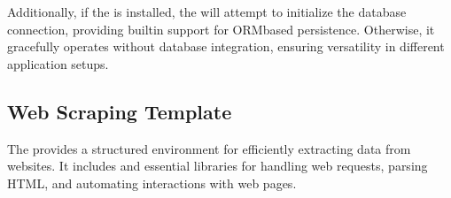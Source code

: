 \documentclass[letterpaper,10pt,english]{sphinxhowto}
\begin{document}
\sphinxAtStartPar
Additionally, if the  is installed, the  will attempt to initialize the database connection, providing built\sphinxhyphen{}in support for ORM\sphinxhyphen{}based persistence. Otherwise, it gracefully operates without database integration, ensuring versatility in different application setups.

\sphinxstepscope


\subsection{Web Scraping Template}
\label{\detokenize{templates/web_scraping/index:web-scraping-template}}\label{\detokenize{templates/web_scraping/index::doc}}
\sphinxAtStartPar
The  provides a structured environment for efficiently extracting data from websites. It includes  and essential libraries for handling web requests, parsing HTML, and automating interactions with web pages.
\end{document}
